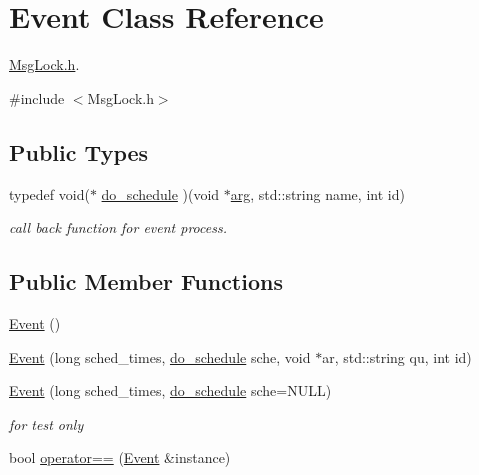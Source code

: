 \hypertarget{classEvent}{\section{\-Event \-Class \-Reference}
\label{d5/da5/classEvent}
}


\hyperlink{MsgLock_8h}{\-Msg\-Lock.\-h}.  




{\ttfamily \#include $<$\-Msg\-Lock.\-h$>$}

\subsection*{\-Public \-Types}
\begin{DoxyCompactItemize}
\item 
typedef void($\ast$ \hyperlink{classEvent_a8e493c850490cee46d90c553eec37a1c}{do\-\_\-schedule} )(void $\ast$\hyperlink{classEvent_ae7c4ba85ebe5cb4c29ba9659c475f269}{arg}, std\-::string name, int id)
\begin{DoxyCompactList}\small\item\em call back function for event process. \end{DoxyCompactList}\end{DoxyCompactItemize}
\subsection*{\-Public \-Member \-Functions}
\begin{DoxyCompactItemize}
\item 
\hyperlink{classEvent_a5a40dd4708297f7031e29b39e039ae10}{\-Event} ()
\item 
\hyperlink{classEvent_af801329053df35da07ec4d03c46c63bb}{\-Event} (long sched\-\_\-times, \hyperlink{classEvent_a8e493c850490cee46d90c553eec37a1c}{do\-\_\-schedule} sche, void $\ast$ar, std\-::string qu, int id)
\item 
\hyperlink{classEvent_ad2f1966199794fba4e23d004cf6fca0a}{\-Event} (long sched\-\_\-times, \hyperlink{classEvent_a8e493c850490cee46d90c553eec37a1c}{do\-\_\-schedule} sche=\-N\-U\-L\-L)
\begin{DoxyCompactList}\small\item\em for test only \end{DoxyCompactList}\item 
bool \hyperlink{classEvent_a02485379dbe8cc36e72eafa052622fe1}{operator==} (\hyperlink{classEvent}{\-Event} \&instance)
\end{DoxyCompactItemize}
